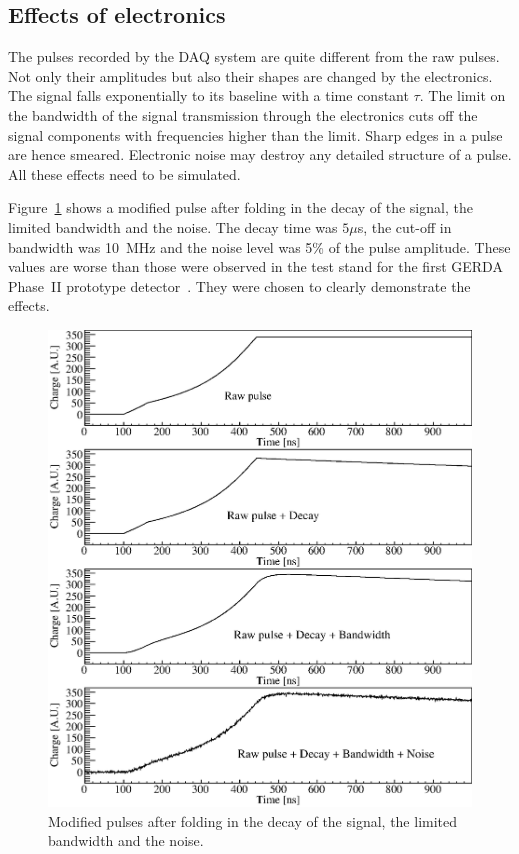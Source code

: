 \documentclass[epj]{svjour}
\begin{document}
\subsection{Effects of electronics} 
\label{s:dbn}
The pulses recorded by the DAQ system are quite different from the raw
pulses. Not only their amplitudes but also their shapes are changed by
the electronics. The signal falls exponentially to its baseline with a
time constant $\tau$. The limit on the bandwidth of the signal
transmission through the electronics cuts off the signal components
with frequencies higher than the limit. Sharp edges in a pulse are
hence smeared. Electronic noise may destroy any detailed structure of
a pulse. All these effects need to be simulated.
 
Figure~\ref{f:elec} shows a modified pulse after folding in the decay
of the signal, the limited bandwidth and the noise. The decay time was
$5 \mu$s, the cut-off in bandwidth was 10~MHz and the noise level was
5\% of the pulse amplitude. These values are worse than those were
observed in the test stand for the first GERDA Phase~II prototype
detector~\cite{si}. They were chosen to clearly demonstrate the
effects.
\begin{figure}[htpb]
\centering
\includegraphics[width=\linewidth]{PSDBN} 
\caption{Modified pulses after folding in the decay of the signal, the
limited bandwidth and the noise.}
\label{f:elec} 
\end{figure}
\end{document}
